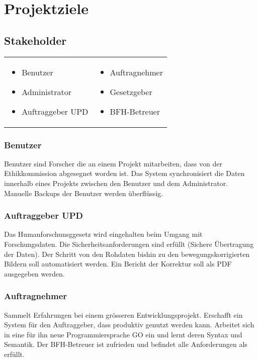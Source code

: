 \chapter{Projektziele}

\section{Stakeholder}

\begin{tabular}{ll}
 \parbox{5cm}{
 \begin{itemize}
  \item Benutzer
  \item Administrator
  \item Auftraggeber UPD
 \end{itemize}}
 &
 \parbox{5cm}{
 \begin{itemize}
  \item Auftragnehmer
  \item Gesetzgeber
  \item BFH-Betreuer
 \end{itemize}}

\end{tabular}

\subsection{Benutzer}
Benutzer sind Forscher die an einem Projekt mitarbeiten, dass von der Ethikkommission abgesegnet worden ist. Das System synchronisiert die Daten innerhalb eines Projekts zwischen den Benutzer und dem Administrator. Manuelle Backups der Benutzer werden überflüssig.

\subsection{Auftraggeber UPD}
Das Humanforschunsggesetz wird eingehalten beim Umgang mit Forschungsdaten. Die Sicherheitsanforderungen sind erfüllt (Sichere Übertragung der Daten). Der Schritt von den Rohdaten bishin zu den bewegungskorrigierten Bildern soll automatisiert werden. Ein Bericht der Korrektur soll als PDF ausgegeben werden.

\subsection{Auftragnehmer}
Sammelt Erfahrungen bei einem grösseren Entwicklungsprojekt. Erschafft ein System für den Auftraggeber, dass produktiv genutzt werden kann. Arbeitet sich in eine für ihn neue Programmiersprache GO ein und lernt deren Syntax und Semantik.
Der BFH-Betreuer ist zufrieden und befindet alle Anforderungen als erfüllt.


